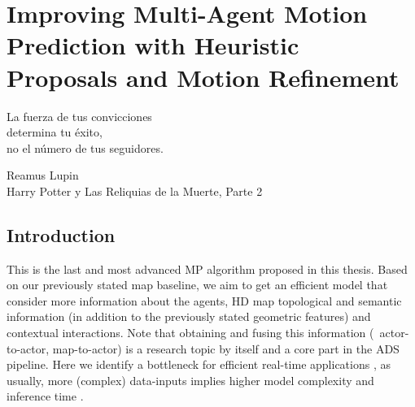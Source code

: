% 
% 
% 
% 
% 
% 
% 

\chapter{Improving Multi-Agent Motion Prediction with Heuristic Proposals and Motion Refinement}
\label{cha:improving_multi_agent}

\begin{FraseCelebre}
	\begin{Frase}
		La fuerza de tus convicciones \\
		determina tu éxito, \\
		no el número de tus seguidores.
	\end{Frase}
	\begin{Fuente}
		Reamus Lupin \\
		Harry Potter y Las Reliquias de la Muerte, Parte 2
	\end{Fuente}
\end{FraseCelebre}

\section{Introduction}
\label{sec:7_introduction}

This is the last and most advanced \ac{MP} algorithm proposed in this thesis. Based on our previously stated map baseline, we aim to get an efficient model that consider more information about the agents, HD map topological and semantic information (in addition to the previously stated geometric features) and contextual interactions. Note that obtaining and fusing this information (\eg \ actor-to-actor, map-to-actor) is a research topic by itself \cite{varadarajan2022multipath++, zeng2021lanercnn, liang2020learning} and a core part in the \ac{ADS} pipeline. Here we identify a bottleneck for efficient real-time applications \cite{KATRAKAZAS2015416realtime, gomez2021smartmot}, as usually, more (complex) data-inputs implies higher model complexity and inference time \cite{gao2020vectornet}. 


